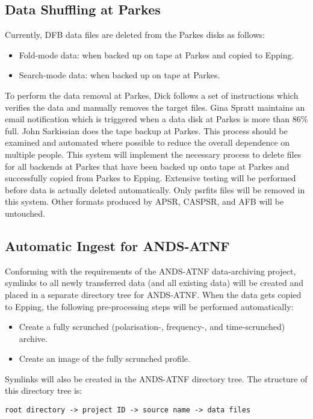 \documentclass{article}
\begin{document}
\subsection{Data Shuffling at Parkes}
Currently, DFB data files are deleted from the Parkes disks as follows:
\begin{itemize}
\item Fold-mode data: when backed up on tape at Parkes and copied to Epping.
\item Search-mode data: when backed up on tape at Parkes.
\end{itemize}

To perform the data removal at Parkes, Dick follows a set of instructions which verifies the data and manually removes the target files. Gina Spratt maintains an email notification which is triggered when a data disk at Parkes is more than 86\% full. John Sarkissian does the tape backup at Parkes. This process should be examined and automated where possible to reduce the overall dependence on multiple people. This system will implement the necessary process to delete files for all backends at Parkes that have been backed up onto tape at Parkes and successfully copied from Parkes to Epping. Extensive testing will be performed before data is actually deleted automatically. Only psrfits files will be removed in this system. Other formats produced by APSR, CASPSR, and AFB will be untouched.

\subsection{Automatic Ingest for ANDS-ATNF}
Conforming with the requirements of the ANDS-ATNF data-archiving project, symlinks to all newly transferred data (and all existing data) will be created and placed in a separate directory tree for ANDS-ATNF. When the data gets copied to Epping, the following pre-processing steps will be performed automatically:

\begin{itemize}
\item Create a fully scrunched (polarisation-, frequency-, and time-scrunched) archive.
\item Create an image of the fully scrunched profile.
\end{itemize}

Symlinks will also be created in the ANDS-ATNF directory tree. The structure of this directory tree is:

\begin{verbatim}
root directory -> project ID -> source name -> data files
\end{verbatim}
\end{document}
